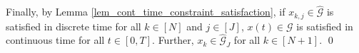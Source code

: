 \documentclass{IEEEtran}
\begin{document}
\begin{appendices}
Finally, by Lemma \ref{lem_cont_time_constraint_satisfaction}, if $x_{k,j}\in\hat{\mathcal{G}}$ is satisfied in discrete time for all $k\in[N]$ and $j\in[J]$, $x(t)\in{\mathcal{G}}$ is satisfied in continuous time for all $t\in[0,T]$. Further, $x_k\in\hat{\mathcal{G}}_J$ for all $k\in[N+1]$. \qed









\end{appendices}
\end{document}
